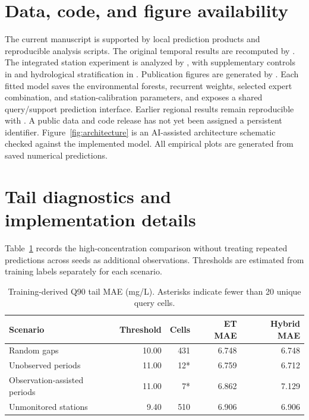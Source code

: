 \documentclass[11pt]{article}
\begin{document}
\section*{Data, code, and figure availability}
The current manuscript is supported by local prediction products and reproducible analysis scripts. The original temporal results are recomputed by . The integrated station experiment is analyzed by , with supplementary controls in  and hydrological stratification in . Publication figures are generated by . Each fitted model saves the environmental forests, recurrent weights, selected expert combination, and station-calibration parameters, and exposes a shared query/support prediction interface. Earlier regional results remain reproducible with . A public data and code release has not yet been assigned a persistent identifier. Figure~\ref{fig:architecture} is an AI-assisted architecture schematic checked against the implemented model. All empirical plots are generated from saved numerical predictions.

\appendix
\section{Tail diagnostics and implementation details}\label{app:tail}
Table~\ref{tab:tail} records the high-concentration comparison without treating repeated predictions across seeds as additional observations. Thresholds are estimated from training labels separately for each scenario.

\begin{table}[htbp]\centering\small
\caption{Training-derived Q90 tail MAE (mg/L). Asterisks indicate fewer than 20 unique query cells.}
\label{tab:tail}
\begin{tabular}{>{\raggedright\arraybackslash}p{3.8cm}rrrr}\toprule
Scenario & Threshold & Cells & ET MAE & Hybrid MAE\\\midrule
Random gaps & 10.00 & 431 & 6.748 & 6.748\\
Unobserved periods & 11.00 & 12* & 6.759 & 6.712\\
Observation-assisted periods & 11.00 & 7* & 6.862 & 7.129\\
Unmonitored stations & 9.40 & 510 & 6.906 & 6.906\\
\bottomrule\end{tabular}
\end{table}
\end{document}
